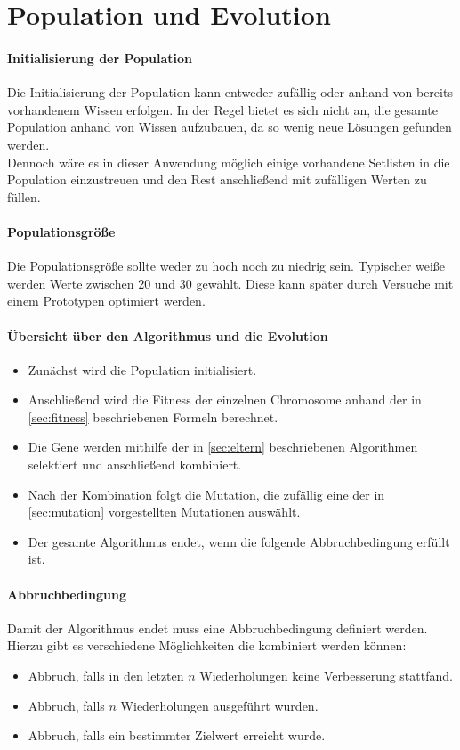 \section{Population und Evolution}\label{sec:popEv}
\paragraph{Initialisierung der Population}
Die Initialisierung der Population kann entweder zufällig oder anhand von bereits vorhandenem Wissen erfolgen.
In der Regel bietet es sich nicht an, die gesamte Population anhand von Wissen aufzubauen, da so
wenig neue Lösungen gefunden werden.\\
Dennoch wäre es in dieser Anwendung möglich einige vorhandene Setlisten in die Population einzustreuen und den Rest
anschließend mit zufälligen Werten zu füllen.

\paragraph{Populationsgröße}
Die Populationsgröße sollte weder zu hoch noch zu niedrig sein. Typischer weiße werden Werte zwischen
20 und 30 gewählt. Diese kann später durch Versuche mit einem Prototypen optimiert werden.

\paragraph{Übersicht über den Algorithmus und die Evolution}

\begin{itemize}
    \item Zunächst wird die Population initialisiert.
    \item Anschließend wird die Fitness der einzelnen Chromosome anhand der in \autoref{sec:fitness} beschriebenen
        Formeln berechnet.
    \item Die Gene werden mithilfe der in \autoref{sec:eltern} beschriebenen Algorithmen selektiert und anschließend
        kombiniert.
    \item Nach der Kombination folgt die Mutation, die zufällig eine der in \autoref{sec:mutation} vorgestellten
    Mutationen auswählt.
    \item Der gesamte Algorithmus endet, wenn die folgende Abbruchbedingung erfüllt ist.
\end{itemize}

\paragraph{Abbruchbedingung}\label{para:Abbruchbedingung}
Damit der Algorithmus endet muss eine Abbruchbedingung definiert werden.
Hierzu gibt es verschiedene Möglichkeiten die kombiniert werden können:
\begin{itemize}
    \item Abbruch, falls in den letzten $n$ Wiederholungen keine Verbesserung stattfand.
    \item Abbruch, falls $n$ Wiederholungen ausgeführt wurden.
    \item Abbruch, falls ein bestimmter Zielwert erreicht wurde.
\end{itemize}

